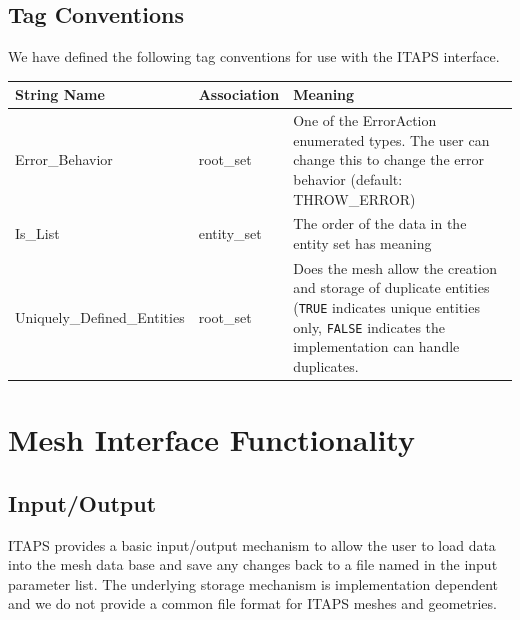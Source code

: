 \documentclass{article}
\begin{document}
\subsection{Tag Conventions}

We have defined the following tag conventions for use with the 
ITAPS interface.\\

\begin{tabular}{llp{2.4in}}
\hline
String Name &Association  &Meaning\\
\hline
Error\_Behavior & root\_set & One of the ErrorAction enumerated types. 
 The user can change this to change the error behavior (default: THROW\_ERROR) \\
Is\_List  & entity\_set & The order of the data in the entity set has 
meaning\\

Uniquely\_Defined\_Entities &root\_set  &Does the mesh allow the 
creation and storage of duplicate entities ({\tt TRUE} indicates unique entities 
   only, {\tt FALSE} indicates the implementation can 
   handle duplicates.\\
\hline
\end{tabular}

\section{Mesh Interface Functionality}

\subsection{Input/Output}

ITAPS provides a basic input/output mechanism to allow the user 
to load data into the mesh data base and save any changes back 
to a file named in the input parameter list. The underlying storage 
mechanism is implementation dependent and we do not provide a 
common file format for ITAPS meshes and geometries. \\
\end{document}
